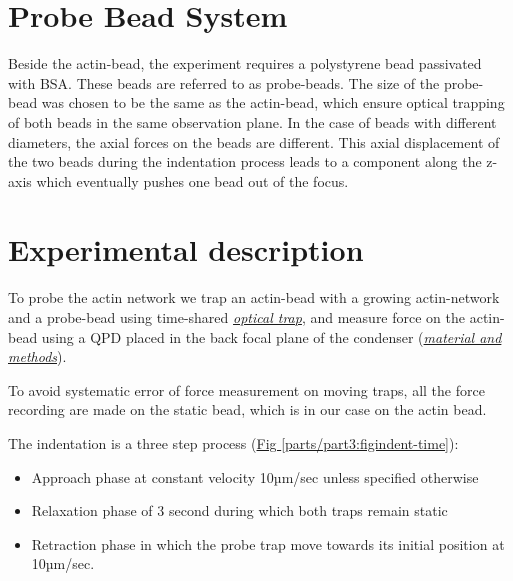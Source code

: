 \documentclass[A4paperpaper,11pt,english]{sphinxmanual}
\begin{document}
\section{Probe Bead System}
\label{parts/part3:probe-bead-system}
Beside the actin-bead, the experiment requires a polystyrene bead passivated
with BSA. These beads are referred to as probe-beads.  The size of the
probe-bead was chosen to be the same as the actin-bead, which ensure optical
trapping of both beads in the same observation plane. In the case of beads with
different diameters, the axial forces on the beads are different. This axial
displacement of the two beads during the indentation process leads to a
component along the z-axis which  eventually pushes one bead out of the focus.


\section{Experimental description}
\label{parts/part3:experimental-description}
To probe the actin network we trap an actin-bead with a growing actin-network
and a probe-bead using time-shared {\hyperref[parts/part2:time-shared-ot]{\emph{optical trap}}},  and
measure force on the actin-bead using a QPD placed in the back focal plane of
the condenser ({\hyperref[parts/part2:m-et-m]{\emph{material and methods}}}).

To avoid systematic error of force measurement on moving traps, all the force
recording are  made on the static bead, which is in our case on the actin bead.

The indentation is a three step process (\hyperref[parts/part3:figindent-time]{Fig  \ref*{parts/part3:figindent-time}}):
\begin{itemize}
\item {} 
Approach phase at constant velocity 10µm/sec unless specified otherwise

\item {} 
Relaxation phase of 3 second during which both traps remain static

\item {} 
Retraction phase in which the probe trap move towards its initial position at 10µm/sec.

\end{itemize}
\end{document}
